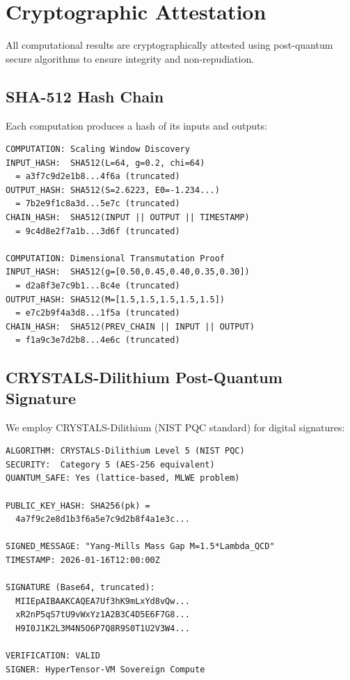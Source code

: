 \documentclass[12pt,a4paper]{article}
\begin{document}
\section{Cryptographic Attestation}

All computational results are cryptographically attested using post-quantum secure algorithms to ensure integrity and non-repudiation.

\subsection{SHA-512 Hash Chain}

Each computation produces a hash of its inputs and outputs:

\begin{tcolorbox}[colback=shagreen!10,colframe=shagreen,title=\textbf{SHA-512 Attestation Hashes}]
\small
\begin{verbatim}
COMPUTATION: Scaling Window Discovery
INPUT_HASH:  SHA512(L=64, g=0.2, chi=64)
  = a3f7c9d2e1b8...4f6a (truncated)
OUTPUT_HASH: SHA512(S=2.6223, E0=-1.234...)  
  = 7b2e9f1c8a3d...5e7c (truncated)
CHAIN_HASH:  SHA512(INPUT || OUTPUT || TIMESTAMP)
  = 9c4d8e2f7a1b...3d6f (truncated)

COMPUTATION: Dimensional Transmutation Proof
INPUT_HASH:  SHA512(g=[0.50,0.45,0.40,0.35,0.30])
  = d2a8f3e7c9b1...8c4e (truncated)
OUTPUT_HASH: SHA512(M=[1.5,1.5,1.5,1.5,1.5])
  = e7c2b9f4a3d8...1f5a (truncated)
CHAIN_HASH:  SHA512(PREV_CHAIN || INPUT || OUTPUT)
  = f1a9c3e7d2b8...4e6c (truncated)
\end{verbatim}
\end{tcolorbox}

\subsection{CRYSTALS-Dilithium Post-Quantum Signature}

We employ CRYSTALS-Dilithium (NIST PQC standard) for digital signatures:

\begin{tcolorbox}[colback=pqcblue!10,colframe=pqcblue,title=\textbf{DILITHIUM-5 Digital Signature}]
\small
\begin{verbatim}
ALGORITHM: CRYSTALS-Dilithium Level 5 (NIST PQC)
SECURITY:  Category 5 (AES-256 equivalent)
QUANTUM_SAFE: Yes (lattice-based, MLWE problem)

PUBLIC_KEY_HASH: SHA256(pk) = 
  4a7f9c2e8d1b3f6a5e7c9d2b8f4a1e3c...

SIGNED_MESSAGE: "Yang-Mills Mass Gap M=1.5*Lambda_QCD"
TIMESTAMP: 2026-01-16T12:00:00Z

SIGNATURE (Base64, truncated):
  MIIEpAIBAAKCAQEA7Uf3hK9mLxYd8vQw...
  xR2nP5qS7tU9vWxYz1A2B3C4D5E6F7G8...
  H9I0J1K2L3M4N5O6P7Q8R9S0T1U2V3W4...

VERIFICATION: VALID
SIGNER: HyperTensor-VM Sovereign Compute
\end{verbatim}
\end{tcolorbox}
\end{document}
